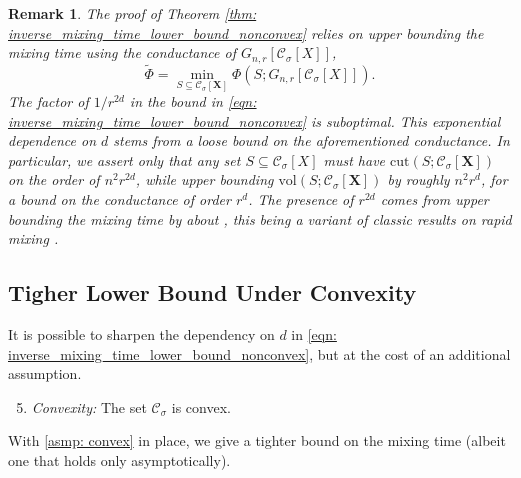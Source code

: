 \documentclass{article}
\newcommand{\vol}{\mathrm{vol}}
\newcommand{\cut}{\mathrm{cut}}
\newcommand{\1}{\mathbf{1}}
\newcommand{\Xbf}{\mathbf{X}}
\newcommand{\Cset}{\mathcal{C}}
\newcommand{\Csig}{\Cset_{\sigma}}
\theoremstyle{aldenthm}
\theoremstyle{aldenrmrk}
\newtheorem{remark}{Remark}
\begin{document}
\begin{remark}
The proof of Theorem \ref{thm: inverse_mixing_time_lower_bound_nonconvex} relies
on upper bounding the mixing time using the \emph{conductance} of $G_{n,r}[\Csig[X]]$, 
$$
\widetilde{\Phi} = \min_{S \subseteq \Csig[\Xbf]} \Phi(S; G_{n,r}[\Csig[X]]).
$$
The factor of $1/r^{2d}$ in the bound in \eqref{eqn:
  inverse_mixing_time_lower_bound_nonconvex} is suboptimal. This exponential 
dependence on $d$ stems from a loose bound on the aforementioned
conductance. In particular, we assert only that any set $S \subseteq \Csig[X]$
must have $\cut(S; \Csig[\Xbf])$ on the order of $n^2 r^{2d}$, while upper bounding
$\vol(S; \Csig[\Xbf])$ by roughly $n^2 r^d$, for a bound on the conductance of
order $r^d$. The presence of $r^{2d}$ comes from upper bounding the mixing time
by about , this being a variant of classic results
on rapid mixing \citep{jerrum89}.  
\end{remark}

\subsection{Tigher Lower Bound Under Convexity}

It is possible to sharpen the dependency on $d$ in 
\eqref{eqn: inverse_mixing_time_lower_bound_nonconvex}, but at the cost of an  
additional assumption.
\begin{enumerate}[label=(A\arabic*)]
\setcounter{enumi}{4}
\item 
\label{asmp: convex}
\emph{Convexity:} The set $\Cset_\sigma$ is convex. 
\end{enumerate}

With \ref{asmp: convex} in place, we give a tighter bound on the
mixing time (albeit one that holds only asymptotically).   
\end{document}
